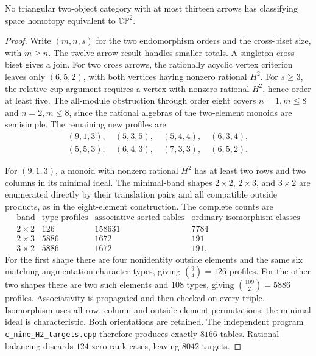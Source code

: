 \begin{proposition}\label{C:thirteen-triangular}
No triangular two-object category with at most thirteen arrows
has classifying space homotopy equivalent to $\mathbb{CP}^2$.
\end{proposition}
\begin{proof}
Write $(m,n,s)$ for the two endomorphism orders and the cross-biset
size, with $m\geq n$. The twelve-arrow result handles smaller totals.
A singleton cross-biset gives a join. For two cross arrows, the
rationally acyclic vertex criterion leaves only $(6,5,2)$, with
both vertices having nonzero rational $H^2$. For $s\geq3$, the
relative-cup argument requires a vertex with nonzero rational
$H^2$, hence order at least five. The all-module obstruction through
order eight covers $n=1,m\leq8$ and $n=2,m\leq8$, since the
rational algebras of the two-element monoids are semisimple.
The remaining new profiles are
\[
\begin{gathered}
(9,1,3),\quad(5,3,5),\quad(5,4,4),\quad(6,3,4),\\
(5,5,3),\quad(6,4,3),\quad(7,3,3),\quad(6,5,2).
\end{gathered}
\]

For $(9,1,3)$, a monoid with nonzero rational $H^2$ has at least
two rows and two columns in its minimal ideal. The minimal-band
shapes $2\times2$, $2\times3$, and $3\times2$ are enumerated
directly by their translation pairs and all compatible outside
products, as in the eight-element construction. The complete counts
are
\[
\begin{array}{c|r|r|r}
\text{band}&\text{type profiles}&\text{associative sorted tables}
 &\text{ordinary isomorphism classes}\\\hline
2\times2&126&158631&7784\\
2\times3&5886&1672&191\\
3\times2&5886&1672&191.
\end{array}
\]
For the first shape there are four nonidentity outside elements
and the same six matching augmentation-character types, giving
$\binom{9}{4}=126$ profiles. For the other two shapes there are
two such elements and $108$ types, giving
$\binom{109}{2}=5886$ profiles. Associativity is propagated and
then checked on every triple. Isomorphism uses all row, column
and outside-element permutations; the minimal ideal is
characteristic. Both orientations are retained.
The independent program \texttt{c\_nine\_H2\_targets.cpp}
therefore produces exactly $8166$ tables. Rational balancing
discards $124$ zero-rank cases, leaving $8042$ targets.


\end{proof}
